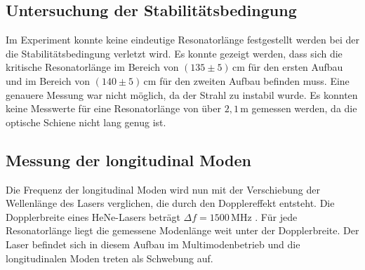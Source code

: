 \subsection{Untersuchung der Stabilitätsbedingung}
\label{sec:Stab_be}
Im Experiment konnte keine eindeutige Resonatorlänge festgestellt werden bei der die Stabilitätsbedingung verletzt wird.
Es konnte gezeigt werden, dass sich die kritische Resonatorlänge im Bereich von $ \left( 135 \pm 5 \right) \, \unit{\centi\meter}$ für den ersten Aufbau und im Bereich von
$ \left( 140 \pm 5 \right) \, \unit{\centi\meter}$ für den zweiten Aufbau befinden muss. Eine genauere Messung war nicht möglich, da der Strahl zu instabil wurde.
Es konnten keine Messwerte für eine Resonatorlänge von über $2,1 \, \unit{\meter}$ gemessen werden, da die optische Schiene nicht lang genug ist.

\subsection{Messung der longitudinal Moden}
\label{sec:Stab_be}

Die Frequenz der longitudinal Moden wird nun mit der Verschiebung der Wellenlänge des Lasers verglichen, die durch den Dopplereffekt entsteht.
Die Dopplerbreite eines HeNe-Lasers beträgt $ \Delta f = 1500 \, \unit{\mega\hertz}$ \cite{eicheich}. Für jede Resonatorlänge liegt die gemessene Modenlänge weit unter der Dopplerbreite.
Der Laser befindet sich in diesem Aufbau im Multimodenbetrieb und die longitudinalen Moden treten als Schwebung auf.
